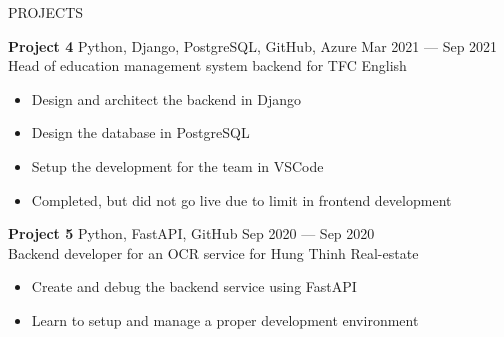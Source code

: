 \documentclass{resume} %
\begin{document}
\begin{rSection}{PROJECTS}
  \item \textbf{Project 4} {Python, Django, PostgreSQL, GitHub, Azure} \hfill Mar 2021 --- Sep 2021 \\
  Head of education management system backend for TFC English \hfill
  \begin{itemize}
    \item Design and architect the backend in Django
    \item Design the database in PostgreSQL
    \item Setup the development for the team in VSCode
    \item Completed, but did not go live due to limit in frontend development
  \end{itemize}
  \item \textbf{Project 5} {Python, FastAPI, GitHub} \hfill Sep 2020 --- Sep 2020 \\
  Backend developer for an OCR service for Hung Thinh Real-estate \hfill
  \begin{itemize}
    \item Create and debug the backend service using FastAPI
    \item Learn to setup and manage a proper development environment
  \end{itemize}
\end{rSection}



\end{document}

